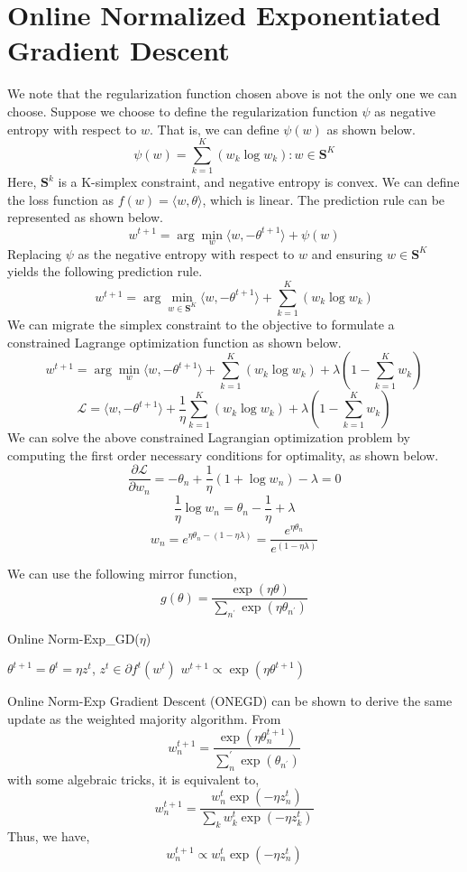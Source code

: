 \documentclass[11pt]{article}
\begin{document}
\section{Online Normalized Exponentiated Gradient Descent}
We note that the regularization function chosen above is not the only one we can choose. Suppose we choose to define the regularization function $\psi$ as negative entropy with respect to $w$. That is, we can define $\psi(w)$ as shown below.
\[ \psi(w) = \sum_{k=1}^K (w_k\log{w_k}) : w \in \mathbf{S}^K \]
Here, $\mathbf{S}^k$ is a K-simplex constraint, and negative entropy is convex. We can define the loss function as $f(w) = \langle w, \theta \rangle$, which is linear. The prediction rule can be represented as shown below.
\[ w^{t+1} = \arg\min_w \langle w, -\theta^{t+1} \rangle + \psi(w) \]
Replacing $\psi$ as the negative entropy with respect to $w$ and ensuring $w \in \mathbf{S}^K$ yields the following prediction rule.
\[ w^{t+1} = \arg\min_{w \in \mathbf{S}^K} \langle w, -\theta^{t+1} \rangle + \sum_{k=1}^K (w_k\log{w_k}) \]
We can migrate the simplex constraint to the objective to formulate a constrained Lagrange optimization function as shown below.
\[ w^{t+1} = \arg\min_{w} \langle w, -\theta^{t+1} \rangle + \sum_{k=1}^K (w_k\log{w_k}) + \lambda (1 - \sum_{k=1}^K w_k) \]
\[ \mathcal{L} = \langle w, -\theta^{t+1} \rangle + \frac{1}{\eta}\sum_{k=1}^K (w_k\log{w_k}) + \lambda (1 - \sum_{k=1}^K w_k) \]
We can solve the above constrained Lagrangian optimization problem by computing the first order necessary conditions for optimality, as shown below.
\[ \frac{\partial\mathcal{L}}{\partial w_n} = -\theta_n + \frac{1}{\eta}(1 + \log{w_n}) - \lambda = 0 \]
\[ \frac{1}{\eta}\log{w_n} = \theta_n - \frac{1}{\eta} + \lambda \]
\[ w_n = e^{\eta\theta_n - (1 - \eta\lambda)} = \frac{e^{\eta\theta_n}}{e^{(1 - \eta\lambda)}} \]

We can use the following mirror function,
$$
g(\theta) = \frac{\exp{(\eta \theta)}}{\sum_{n^\prime} \exp{(\eta \theta_{n^\prime})}}
$$

\begin{algorithm}
\caption{Online Norm-Exp\_GD($\eta$)}
\begin{algorithmic}[1]
        \STATE $\theta^{t+1} = \theta^t = \eta z^t$, $z^t \in \partial f^t (w^t)$
        \STATE $w^{t+1} \propto \exp{(\eta \theta^{t+1})}$
    \ENDFOR
\end{algorithmic}
\end{algorithm}
Online Norm-Exp Gradient Descent (ONEGD) can be shown to derive the same update as the weighted majority algorithm.
From $$w_n^{t+1} = \frac{\exp{(\eta \theta_n^{t+1})}}{\sum_n^\prime \exp{(\theta_{n^\prime})}}$$
with some algebraic tricks, it is equivalent to,
$$
w_n^{t+1} = \frac{w_n^t \exp{(-\eta z_n^t)}}{\sum_k w_k^t \exp{(-\eta z_k^t)}}
$$
Thus, we have, 
$$
w_n^{t+1} \propto w_n^t \exp{(-\eta z_n^t)}
$$
\end{document}
